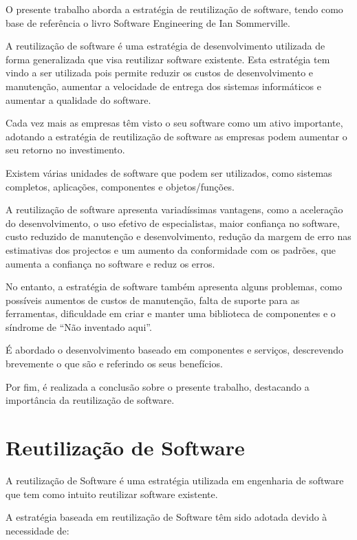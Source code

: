 \documentclass[runningheads]{llncs}
\begin{document}
O presente trabalho aborda a estratégia de reutilização de software, tendo como base de referência o livro Software Engineering de Ian Sommerville\cite{ref_book1}. \par
A reutilização de software é uma estratégia de desenvolvimento utilizada de forma generalizada que visa reutilizar software existente. Esta estratégia tem vindo a ser utilizada pois permite reduzir os custos de desenvolvimento e manutenção, aumentar a velocidade de entrega dos sistemas informáticos e aumentar a qualidade do software.\par
Cada vez mais as empresas têm visto o seu software como um ativo importante, adotando a estratégia de reutilização de software as empresas podem aumentar o seu retorno no investimento.\par
Existem várias unidades de software que podem ser utilizados, como sistemas completos, aplicações, componentes e objetos/funções.\par
A reutilização de software apresenta variadíssimas vantagens, como a aceleração do desenvolvimento, o uso efetivo de especialistas, maior confiança no software, custo reduzido de manutenção e desenvolvimento, redução da margem de erro nas estimativas dos projectos e um aumento da conformidade com os padrões, que aumenta a confiança no software e reduz os erros.\par
No entanto, a estratégia de software também apresenta alguns problemas, como possíveis aumentos de custos de manutenção, falta de suporte para as ferramentas, dificuldade em criar e manter uma biblioteca de componentes e o síndrome de “Não inventado aqui”.\par
É abordado o desenvolvimento baseado em componentes e serviços, descrevendo brevemente o que são e referindo os seus benefícios.\par
Por fim, é realizada a conclusão sobre o presente trabalho, destacando a importância da  reutilização de software.\par


\newpage
\section{Reutilização de Software}

A reutilização de Software \cite{ref_book1} é uma estratégia utilizada em engenharia de software que tem como intuito reutilizar software existente.\par
A estratégia baseada em reutilização de Software têm sido adotada devido à necessidade de:
\end{document}
